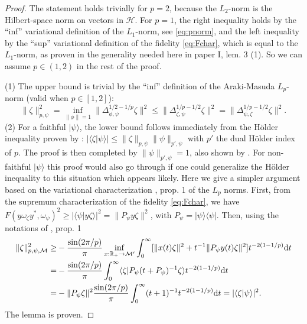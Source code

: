 \documentclass[english,a4paper,12pt]{article}
\def\cM{{\mathfrak M}}
\newcommand{\ca}[1]{{\cal #1}}
\newcommand{\ben}{\begin{equation}}
\newcommand{\een}{\end{equation}}
\def\cM{{\ca M}}
\newcommand{\dd}{{\rm d}}
\newcommand{\RR}{\mathbb{R}}
\begin{document}
\begin{proof}
The statement holds trivially for $p=2$, because the $L_2$-norm is the Hilbert-space norm on vectors in $\mathscr H$. For $p=1$, the right 
inequality holds by the ``inf'' variational definition of the $L_1$-norm, see \eqref{eq:pnorm}, and the left inequality by the 
``sup'' variational definition of the fidelity \eqref{eq:Fchar}, which is equal to the $L_1$-norm, as proven 
in the generality needed here in paper I, lem. 3 (1). 
So we can assume $p \in (1,2)$ in the rest of the proof.

(1) The upper  bound is trivial by the ``inf'' definition of the Araki-Masuda $L_p$-norm (valid when $p \in [1,2]$):
\ben
\| \zeta\|_{p,\psi}^2  = \inf_{\|\phi\|=1} \| \Delta_{\phi,\psi}^{1/2-1/p} \zeta \|^2 \le \| \Delta_{\zeta,\psi}^{1/p-1/2} \zeta \|^2 
=  \| \Delta^{1/p-1/2}_{\psi,\zeta} \zeta \|^2.
\een
(2) For a faithful $|\psi\rangle$, the lower bound follows immediately from the H\" older inequality proven by \cite{AM}:
$| \langle \zeta | \psi \rangle | \le \| \zeta \|_{p,\psi} \| \psi \|_{p',\psi}$ with $p'$ the dual H\" older index of $p$.
 The proof is then completed by $\| \psi \|_{p',\psi} =1$, also shown by \cite{AM}. For non-faithful $|\psi\rangle$
 this proof would also go through if one could generalize the H\" older inequality to this situation which appears likely. 
 Here we give a simpler argument 
 based on the variational characterization \cite{Hollands2}, prop. 1 of the $L_p$ norms. 
 First, from the supremum characterization of the fidelity \eqref{eq:Fchar}, we 
 have $F(y\omega_\zeta y^*,\omega_\psi)^2\ge |\langle \psi | y \zeta \rangle|^2 = \| P_\psi y \zeta\|^2$, with $P_\psi = |\psi \rangle \langle \psi |$.
 Then, using the notations of \cite{Hollands2}, prop. 1 
 \ben
 \begin{split}
\| \zeta \|_{p,\psi,\cM}^2
\ge &
-\frac{\sin(2\pi/p)}{\pi}
\inf_{x: \RR_+ \to \cM'} \int_0^\infty [\|x(t) \zeta \|^2  + t^{-1} \| P_\psi y(t) \zeta\|^2] t^{-2(1-1/p)} \dd t \\
= &
-\frac{\sin(2\pi/p)}{\pi} \int_0^\infty \langle \zeta | P_\psi(t+P_\psi)^{-1}  \zeta\rangle t^{-2(1-1/p)} \dd t \\
= &
-\| P_\psi \zeta\|^2 \frac{\sin(2\pi/p)}{\pi} \int_0^\infty (t+1)^{-1}  t^{-2(1-1/p)} \dd t 
=  | \langle \zeta | \psi \rangle |^2.
\end{split}
\een
The lemma is proven.
\end{proof}
\end{document}
